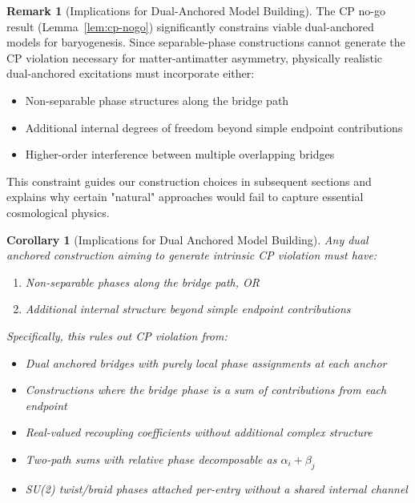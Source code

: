 \documentclass[11pt]{article}
\theoremstyle{plain}
\newtheorem{corollary}[theorem]{Corollary}
\theoremstyle{definition}
\newtheorem{remark}[theorem]{Remark}
\begin{document}
\begin{remark}[Implications for Dual-Anchored Model Building]
  The CP no-go result (Lemma~\ref{lem:cp-nogo}) significantly constrains viable dual-anchored
  models for baryogenesis. Since separable-phase constructions cannot generate the CP violation
  necessary for matter-antimatter asymmetry, physically realistic dual-anchored excitations must
  incorporate either:
  \begin{itemize}
    \item Non-separable phase structures along the bridge path
    \item Additional internal degrees of freedom beyond simple endpoint contributions
    \item Higher-order interference between multiple overlapping bridges
  \end{itemize}
  This constraint guides our construction choices in subsequent sections and explains why
  certain "natural" approaches would fail to capture essential cosmological physics.
\end{remark}

\begin{corollary}[Implications for Dual Anchored Model Building]
  \label{cor:phase-separable}
  Any dual anchored construction aiming to generate intrinsic CP violation must have:
  \begin{enumerate}
    \item Non-separable phases along the bridge path, OR
    \item Additional internal structure beyond simple endpoint contributions
  \end{enumerate}

  Specifically, this rules out CP violation from:
  \begin{itemize}
    \item Dual anchored bridges with purely local phase assignments at each anchor
    \item Constructions where the bridge phase is a sum of contributions from each endpoint
    \item Real-valued recoupling coefficients without additional complex structure
    \item Two-path sums with relative phase decomposable as $\alpha_i + \beta_j$
    \item SU(2) twist/braid phases attached per-entry without a shared internal channel
  \end{itemize}
\end{corollary}
\end{document}
